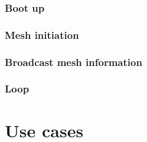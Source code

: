 			\subsubsection{Boot up}
			
			\subsubsection{Mesh initiation}
			
			\subsubsection{Broadcast mesh information}
			
			\subsubsection{Loop}
			
	\section{Use cases}
	
